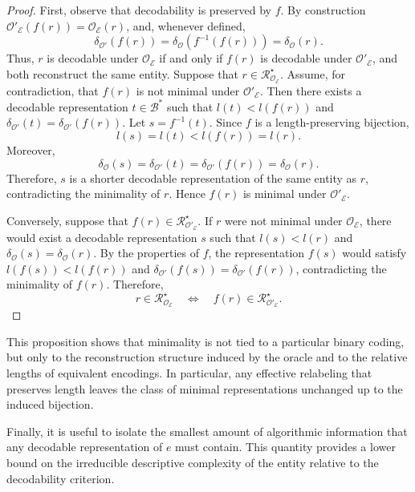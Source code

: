 \begin{proof}
First, observe that decodability is preserved by $f$. By construction $\mathcal{O}'_{\mathcal{E}}(f(r)) = \mathcal{O}_{\mathcal{E}}(r)$, and, whenever defined,
\[
\delta_{\mathcal{O}'}(f(r)) = \delta_{\mathcal{O}}(f^{-1}(f(r))) = \delta_{\mathcal{O}}(r).
\]
Thus, $r$ is decodable under $\mathcal{O}_{\mathcal{E}}$ if and only if $f(r)$ is decodable under $\mathcal{O}'_{\mathcal{E}}$, and both reconstruct the same entity. Suppose that $r \in \mathcal{R}^\star_{\mathcal{O}_{\mathcal{E}}}$. Assume, for contradiction, that $f(r)$ is not minimal under $\mathcal{O}'_{\mathcal{E}}$. Then there exists a decodable representation $t \in \mathcal{B}^\ast$ such that $l(t) < l(f(r))$ and $\delta_{\mathcal{O}'}(t) = \delta_{\mathcal{O}'}(f(r))$. Let $s=f^{-1}(t)$. Since $f$ is a length-preserving bijection,
\[
l(s)=l(t)<l(f(r))=l(r).
\]
Moreover,
\[
\delta_{\mathcal{O}}(s) = \delta_{\mathcal{O}'}(t) =
\delta_{\mathcal{O}'}(f(r)) = \delta_{\mathcal{O}}(r).
\]
Therefore, $s$ is a shorter decodable representation of the same entity as $r$, contradicting the minimality of $r$. Hence $f(r)$ is minimal under $\mathcal{O}'_{\mathcal{E}}$.

Conversely, suppose that $f(r) \in \mathcal{R}^\star_{\mathcal{O}'_{\mathcal{E}}}$. If $r$ were not minimal under $\mathcal{O}_{\mathcal{E}}$, there would exist a decodable representation $s$ such that $l(s)<l(r)$ and $\delta_{\mathcal{O}}(s)=\delta_{\mathcal{O}}(r)$. By the properties of $f$, the representation $f(s)$ would satisfy $l(f(s))<l(f(r))$ and $\delta_{\mathcal{O}'}(f(s)) = \delta_{\mathcal{O}'}(f(r))$, contradicting the minimality of $f(r)$. Therefore,
\[
r \in \mathcal{R}^\star_{\mathcal{O}_{\mathcal{E}}}
\quad\Longleftrightarrow\quad
f(r) \in \mathcal{R}^\star_{\mathcal{O}'_{\mathcal{E}}}.
\]
\end{proof}

This proposition shows that minimality is not tied to a particular binary coding, but only to the reconstruction structure induced by the oracle and to the relative lengths of equivalent encodings. In particular, any effective relabeling that preserves length leaves the class of minimal representations unchanged up to the induced bijection.

Finally, it is useful to isolate the smallest amount of algorithmic information that any decodable representation of $e$ must contain. This quantity provides a lower bound on the irreducible descriptive complexity of the entity relative to the decodability criterion.

